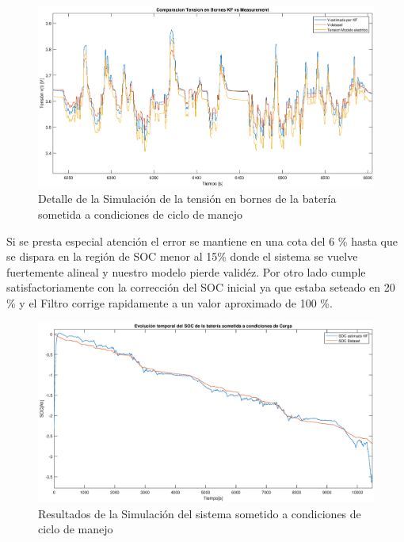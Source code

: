 \documentclass[10pt,a4paper]{article}
\begin{document}
	\begin{figure}[h!]
		\begin{center}
			\includegraphics[width=1\textwidth]{Tension_Sim_zoom.eps}
			\caption{Detalle de la Simulación de la tensión en bornes de la batería sometida a condiciones de ciclo de manejo}
			\label{Tension_sim_zoom}
		\end{center}
	\end{figure}
	
	\clearpage 
	Si se presta especial atención el error se mantiene en una cota del 6 \% hasta que se dispara en la región de SOC menor al 15\% donde el sistema se vuelve fuertemente alineal y nuestro modelo pierde validéz. Por otro lado cumple satisfactoriamente con la corrección del SOC inicial ya que estaba seteado en 20 \% y el Filtro corrige rapidamente a un valor aproximado de 100 \%. 
	
	
	
	\begin{figure}[h!]
		\begin{center}
			\includegraphics[width=1\textwidth]{Drive_Cycle_1_sim.eps}
			\caption{Resultados de la Simulación del sistema sometido a condiciones de ciclo de manejo}
			\label{Drive_Cycle_1_SOC_sim}
		\end{center}
	\end{figure}
	
\end{document}
